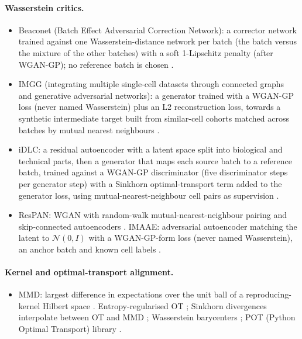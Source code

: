 \documentclass[11pt]{article}
\begin{document}
\paragraph{Wasserstein critics.}
\begin{itemize}
\item Beaconet (Batch Effect Adversarial Correction Network): a corrector network trained against one Wasserstein-distance network per batch (the batch versus the mixture of the other batches) with a soft 1-Lipschitz penalty (after WGAN-GP); no reference batch is chosen \citep{xu2024beaconet}.
\item IMGG (integrating multiple single-cell datasets through connected graphs and generative adversarial networks): a generator trained with a WGAN-GP loss (never named Wasserstein) plus an L2 reconstruction loss, towards a synthetic intermediate target built from similar-cell cohorts matched across batches by mutual nearest neighbours \citep{wang2022imgg}.
\item iDLC: a residual autoencoder with a latent space split into biological and technical parts, then a generator that maps each source batch to a reference batch, trained against a WGAN-GP discriminator (five discriminator steps per generator step) with a Sinkhorn optimal-transport term added to the generator loss, using mutual-nearest-neighbour cell pairs as supervision \citep{jiang2026geometric}.
\item ResPAN: WGAN with random-walk mutual-nearest-neighbour pairing and skip-connected autoencoders \citep{wang2022respan}. IMAAE: adversarial autoencoder matching the latent to $\mathcal{N}(0,I)$ with a WGAN-GP-form loss (never named Wasserstein), an anchor batch and known cell labels \citep{wang2023integrating}.
\end{itemize}

\paragraph{Kernel and optimal-transport alignment.}
\begin{itemize}
\item MMD: largest difference in expectations over the unit ball of a reproducing-kernel Hilbert space \citep{gretton2012kernel}. Entropy-regularised OT \citep{cuturi2013sinkhorn}; Sinkhorn divergences interpolate between OT and MMD \citep{genevay2018learning,feydy2019interpolating}; Wasserstein barycenters \citep{cuturi2014fast}; POT (Python Optimal Transport) library \citep{flamary2021pot}.
\end{itemize}
\end{document}
